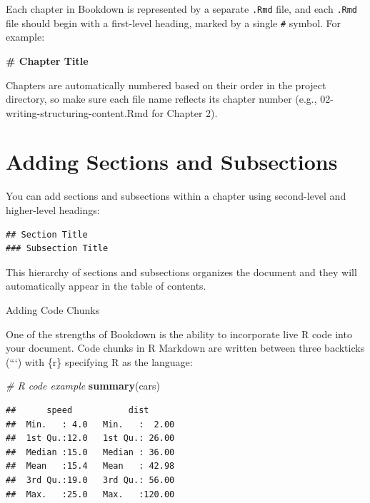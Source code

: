 \documentclass[
]{book}
\newenvironment{Shaded}{\begin{snugshade}}{\end{snugshade}}
\newcommand{\CommentTok}[1]{\textcolor[rgb]{0.56,0.35,0.01}{\textit{#1}}}
\newcommand{\FunctionTok}[1]{\textcolor[rgb]{0.13,0.29,0.53}{\textbf{#1}}}
\newcommand{\NormalTok}[1]{#1}
\theoremstyle{definition}
\theoremstyle{definition}
\theoremstyle{definition}
\theoremstyle{definition}
\theoremstyle{remark}
\begin{document}
Each chapter in Bookdown is represented by a separate \texttt{.Rmd} file, and each \texttt{.Rmd} file should begin with a first-level heading, marked by a single \texttt{\#} symbol. For example:

\begin{Shaded}
\begin{Highlighting}[]
\FunctionTok{\# Chapter Title}
\end{Highlighting}
\end{Shaded}

Chapters are automatically numbered based on their order in the project directory, so make sure each file name reflects its chapter number (e.g., 02-writing-structuring-content.Rmd for Chapter 2).

\section{Adding Sections and Subsections}\label{adding-sections-and-subsections}

You can add sections and subsections within a chapter using second-level and higher-level headings:

\begin{verbatim}
## Section Title
### Subsection Title
\end{verbatim}

This hierarchy of sections and subsections organizes the document and they will automatically appear in the table of contents.

Adding Code Chunks

One of the strengths of Bookdown is the ability to incorporate live R code into your document. Code chunks in R Markdown are written between three backticks (```) with \{r\} specifying R as the language:

\begin{Shaded}
\begin{Highlighting}[]
\CommentTok{\# R code example}
\FunctionTok{summary}\NormalTok{(cars)}
\end{Highlighting}
\end{Shaded}

\begin{verbatim}
##      speed           dist       
##  Min.   : 4.0   Min.   :  2.00  
##  1st Qu.:12.0   1st Qu.: 26.00  
##  Median :15.0   Median : 36.00  
##  Mean   :15.4   Mean   : 42.98  
##  3rd Qu.:19.0   3rd Qu.: 56.00  
##  Max.   :25.0   Max.   :120.00
\end{verbatim}
\end{document}
